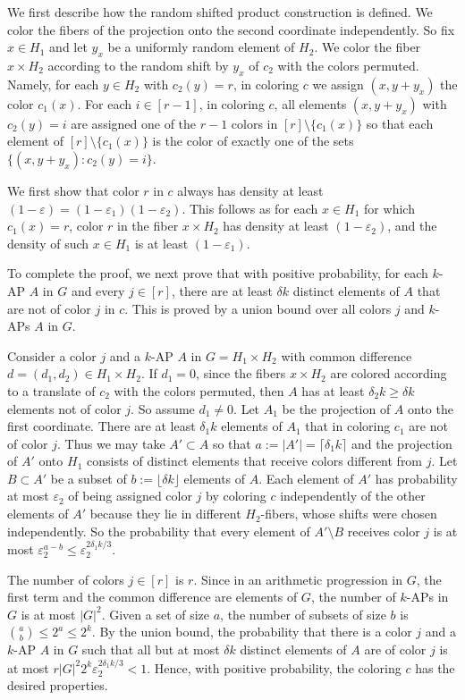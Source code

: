 \documentclass[11pt]{article}
\makeatletter
\numberwithin{equation}{section}
\renewenvironment{proof}[1][\proofname]{\par
  \vspace{-\topsep}%
  \pushQED{\qed}%
  \normalfont
  \topsep0pt \partopsep0pt %
  \trivlist
  \item[\hskip\labelsep
        \itshape
    #1\@addpunct{.}]\ignorespaces
}{%
  \popQED\endtrivlist\@endpefalse
  \addvspace{6pt plus 6pt} %
}
\theoremstyle{definition}
\theoremstyle{remark}
\makeatother
\begin{document}
\begin{proof}
We first describe how the random shifted product construction is defined. We color the fibers of the projection onto the second coordinate independently. So fix $x \in H_1$ and let $y_x$ be a uniformly random element of $H_2$. We color the fiber $x \times H_2$ according to the random shift by $y_x$ of $c_2$ with the colors permuted. Namely, for each $y \in H_2$ with $c_2(y)=r$, in coloring $c$ we assign $(x,y+y_x)$ the color $c_1(x)$. For each $i \in [r-1]$, in coloring $c$, all elements $(x,y+y_x)$ with $c_2(y)=i$ are assigned one of the $r-1$ colors in $[r] \setminus \{c_1(x)\}$ so that each element of $[r] \setminus \{c_1(x)\}$ is the color of exactly one of the sets $\{(x,y+y_x):c_2(y)=i\}$. 

We first show that color $r$ in $c$ always has density at least $(1-\varepsilon)=(1-\varepsilon_1)(1-\varepsilon_2)$. This follows as for each $x \in H_1$ for which $c_1(x)=r$, color $r$ in the fiber $x \times H_2$ has density at least $(1-\varepsilon_2)$, and the density of such $x \in H_1$ is at least $(1-\varepsilon_1)$. 

To complete the proof, we next prove that with positive probability, for each $k$-AP $A$ in $G$ and every $j \in [r]$, there are at least $\delta k$ distinct elements of $A$ that are not of color $j$ in $c$. This is proved by a union bound over all colors $j$ and $k$-APs $A$ in $G$. 

Consider a color $j$ and a $k$-AP $A$ in $G=H_1 \times H_2$ with common difference $d=(d_1,d_2) \in H_1 \times H_2$. If $d_1=0$, since the fibers $x \times H_2$ are colored according to a translate of $c_2$ with the colors permuted, then $A$ has at least $\delta_2 k \geq \delta k$ elements not of color $j$. So assume $d_1 \not = 0$. Let $A_1$ be the projection of $A$ onto the first coordinate. There are at least $\delta_1k$ elements of $A_1$ that in coloring $c_1$ are not of color $j$. Thus we may take $A' \subset A$ so that $a:=|A'|=\lceil \delta_1 k \rceil$ and the projection of $A'$ onto $H_1$ consists of distinct elements that receive colors different from $j$. Let $B \subset A'$ be a subset of $b:=\lfloor \delta k \rfloor$ elements of $A$. Each element of $A'$ has probability at most $\varepsilon_2$ of being assigned color $j$ by coloring $c$ independently of the other elements of $A'$ because they lie in different $H_2$-fibers, whose shifts were chosen independently. So the probability that every element of $A' \setminus B$ receives color $j$ is at most $\varepsilon_2^{a-b} \leq \varepsilon_2^{2\delta_1 k/3}$. 

The number of colors $j \in [r]$ is $r$. Since in an arithmetic progression in $G$, the first term and the common difference are elements of $G$, the number of $k$-APs in $G$ is at most $|G|^2$. Given a set of size $a$, the number of subsets of size $b$ is ${a \choose b} \leq 2^{a}\le 2^k$. By the union bound, the probability that there is a color $j$ and a $k$-AP $A$ in $G$ such that all but at most $\delta k$  distinct elements of $A$ are of color $j$ is at most $r|G|^2 2^k\varepsilon_2^{2\delta_1 k/3}<1$. Hence, with positive probability, the coloring $c$ has the desired properties. 
\end{proof}
\end{document}
